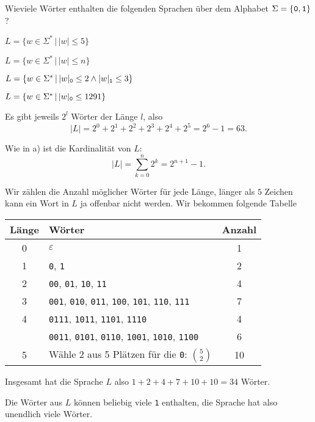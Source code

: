 Wieviele Wörter enthalten die folgenden Sprachen über dem Alphabet 
$\Sigma=\{{\tt 0}, {\tt 1}\}$?
\begin{teilaufgaben}
\item $L=\{ w\in\Sigma^*\,|\, |w|\le 5\}$
\item $L=\{ w\in\Sigma^*\,|\, |w|\le n\}$
\item $L=\{ w\in\Sigma^*\,|\,
|w|_{\tt 0}\le 2
\wedge
|w|_{\tt 1}\le 3
\}$
\item $L=\{ w\in\Sigma^*\,|\, |w|_{\tt 0}\le 1291\}$
\end{teilaufgaben}


\begin{loesung}
\begin{teilaufgaben}
\item
Es gibt jeweils $2^l$ Wörter der Länge $l$, also
\[
|L|=2^0 + 2^1+2^2+2^3+2^4+2^5=2^6-1=63.
\]
\item
Wie in a) ist die Kardinalität von $L$:
\[
|L|=\sum_{k=0}^n2^k=2^{n+1}-1.
\]
\item
Wir zählen die Anzahl möglicher Wörter für jede Länge, länger als
$5$ Zeichen kann ein Wort in $L$ ja offenbar nicht werden. Wir bekommen
folgende Tabelle
\begin{center}
\begin{tabular}{|c|l|c|}
\hline
Länge&Wörter&Anzahl\\
\hline
0&$\varepsilon$&1\\
1&{\tt 0}, {\tt 1}&2\\
2&{\tt 00}, {\tt 01}, {\tt 10}, {\tt 11}&4\\
3&{\tt 001}, {\tt 010}, {\tt 011}, {\tt 100}, {\tt 101}, {\tt 110}, {\tt 111}&7\\
4&{\tt 0111}, {\tt 1011}, {\tt 1101}, {\tt 1110}&4\\
 &{\tt 0011}, {\tt 0101}, {\tt 0110}, {\tt 1001}, {\tt 1010}, {\tt 1100}&6\\
5&Wähle 2 aus 5 Plätzen für die {\tt 0}: $\binom{5}{2}$&10\\
\hline
\end{tabular}
\end{center}
Insgesamt hat die Sprache $L$ also $1+2+4+7+10+10=34$ Wörter.
\item Die Wörter aus $L$ können beliebig viele {\tt 1} enthalten,
die Sprache hat also unendlich viele Wörter.
\qedhere
\end{teilaufgaben}
\end{loesung}
